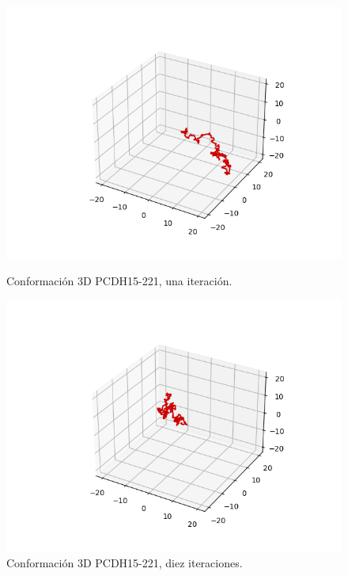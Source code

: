 \documentclass[a4paper,11pt,titlepage]{article}
\theoremstyle{definition}
\begin{document}
\begin{figure}[H]
    \centering
    \begin{minipage}[c]{0.31\textwidth}
        \centering
        \includegraphics[width=\textwidth]{images/PCDH15-221-db_one.png}
        \caption{Conformación 3D PCDH15-221, una iteración.}
        \label{fig:PCDH15-221-one}
    \end{minipage}
    \hfill
    \begin{minipage}[c]{0.31\textwidth}
        \centering
        \includegraphics[width=\textwidth]{images/PCDH15-221-db_iter.png}
        \caption{Conformación 3D PCDH15-221, diez iteraciones.}
        \label{fig:PCDH15-221-multi}
    \end{minipage}

\end{figure}
\end{document}
